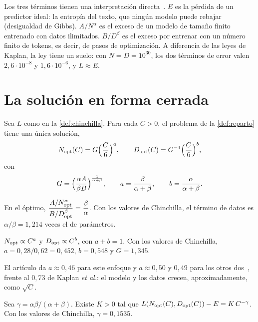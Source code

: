 Los tres términos tienen una interpretación directa~\cite[§3.3]{hoffmann}. $E$ es la pérdida de un predictor ideal: la entropía del texto, que ningún modelo puede rebajar (desigualdad de Gibbs). $A/N^{\alpha}$ es el exceso de un modelo de tamaño finito entrenado con datos ilimitados. $B/D^{\beta}$ es el exceso por entrenar con un número finito de tokens, es decir, de pasos de optimización. A diferencia de las leyes de Kaplan, la ley tiene un suelo: con $N=D=10^{30}$, los dos términos de error valen $2{,}6\cdot 10^{-8}$ y $1{,}6\cdot 10^{-6}$, y $L\approx E$.

\section{La solución en forma cerrada}

\begin{teorema}\label{teo:chinchilla}
Sea $L$ como en la \cref{def:chinchilla}. Para cada $C>0$, el problema de la \cref{def:reparto} tiene una única solución,
\[
N_{\mathrm{opt}}(C)=G\Bigl(\frac{C}{6}\Bigr)^{a},\qquad D_{\mathrm{opt}}(C)=G^{-1}\Bigl(\frac{C}{6}\Bigr)^{b},
\]
con
\[
G=\Bigl(\frac{\alpha A}{\beta B}\Bigr)^{\frac{1}{\alpha+\beta}},\qquad a=\frac{\beta}{\alpha+\beta},\qquad b=\frac{\alpha}{\alpha+\beta}.
\]
\end{teorema}

\addtocounter{equation}{1}%

\begin{corolario}\label{cor:equilibrio}
En el óptimo, $\dfrac{A/N_{\mathrm{opt}}^{\alpha}}{B/D_{\mathrm{opt}}^{\beta}}=\dfrac{\beta}{\alpha}$. Con los valores de Chinchilla, el término de datos es $\alpha/\beta=1{,}214$ veces el de parámetros.
\end{corolario}

\begin{corolario}\label{cor:exponentes}
$N_{\mathrm{opt}}\propto C^{a}$ y $D_{\mathrm{opt}}\propto C^{b}$, con $a+b=1$. Con los valores de Chinchilla, $a=0{,}28/0{,}62=0{,}452$, $b=0{,}548$ y $G=1{,}345$.
\end{corolario}

El artículo da $a\approx 0{,}46$ para este enfoque y $a\approx 0{,}50$ y $0{,}49$ para los otros dos~\cite[tabla~2]{hoffmann}, frente al $0{,}73$ de Kaplan \emph{et al.}: el modelo y los datos crecen, aproximadamente, como $\sqrt C$.

\begin{corolario}\label{cor:perdida}
Sea $\gamma=\alpha\beta/(\alpha+\beta)$. Existe $K>0$ tal que $L(N_{\mathrm{opt}}(C),D_{\mathrm{opt}}(C))-E=K\,C^{-\gamma}$. Con los valores de Chinchilla, $\gamma=0{,}1535$.
\end{corolario}


